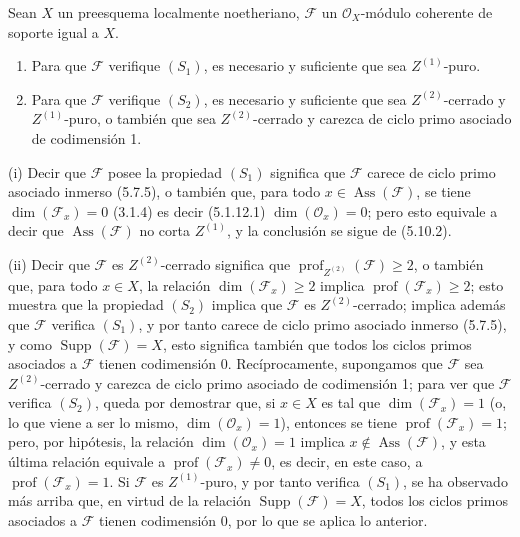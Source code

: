 \begin{proposition}[5.10.14]
\label{IV.2.s5.10.14-fr}
Sean $X$ un preesquema localmente noetheriano, $\mathcal F$ un
$\mathcal O_X$-módulo coherente de soporte igual a $X$.
\begin{enumerate}
\item[\textup{(i)}] Para que $\mathcal F$ verifique $(S_1)$, es necesario y suficiente
que sea $Z^{(1)}$-puro.
\item[\textup{(ii)}] Para que $\mathcal F$ verifique $(S_2)$, es necesario y suficiente
que sea $Z^{(2)}$-cerrado y $Z^{(1)}$-puro, o también que sea $Z^{(2)}$-cerrado
y carezca de ciclo primo asociado de codimensión 1.
\end{enumerate}
\end{proposition}

(i) Decir que $\mathcal F$ posee la propiedad $(S_1)$ significa que
$\mathcal F$ carece de ciclo primo asociado inmerso (5.7.5), o también que,
para todo $x\in\operatorname{Ass}(\mathcal F)$, se tiene
$\dim(\mathcal F_x)=0$ (3.1.4) es decir (5.1.12.1)
$\dim(\mathcal O_x)=0$; pero esto equivale a decir que
$\operatorname{Ass}(\mathcal F)$ no corta $Z^{(1)}$, y la conclusión se sigue
de (5.10.2).

(ii) Decir que $\mathcal F$ es $Z^{(2)}$-cerrado significa que
$\operatorname{prof}_{Z^{(2)}}(\mathcal F)\geq2$, o también que, para todo
$x\in X$, la relación $\dim(\mathcal F_x)\geq2$ implica
$\operatorname{prof}(\mathcal F_x)\geq2$; esto muestra que la propiedad
$(S_2)$ implica que $\mathcal F$ es $Z^{(2)}$-cerrado; implica además que
$\mathcal F$ verifica $(S_1)$, y por tanto carece de ciclo primo asociado
inmerso (5.7.5), y como $\operatorname{Supp}(\mathcal F)=X$, esto significa
también que todos los ciclos primos asociados a $\mathcal F$ tienen
codimensión 0. Recíprocamente, supongamos que $\mathcal F$ sea
$Z^{(2)}$-cerrado y carezca de ciclo primo asociado de codimensión 1; para ver
que $\mathcal F$ verifica $(S_2)$, queda por demostrar que, si $x\in X$ es tal
que $\dim(\mathcal F_x)=1$ (o, lo que viene a ser lo mismo,
$\dim(\mathcal O_x)=1$), entonces se tiene
$\operatorname{prof}(\mathcal F_x)=1$; pero, por hipótesis, la relación
$\dim(\mathcal O_x)=1$ implica $x\notin\operatorname{Ass}(\mathcal F)$, y
esta última relación equivale a $\operatorname{prof}(\mathcal F_x)\neq0$, es
decir, en este caso, a $\operatorname{prof}(\mathcal F_x)=1$. Si $\mathcal F$
es $Z^{(1)}$-puro, y por tanto verifica $(S_1)$, se ha observado más arriba que,
en virtud de la relación $\operatorname{Supp}(\mathcal F)=X$, todos los ciclos
primos asociados a $\mathcal F$ tienen codimensión 0, por lo que se aplica lo
anterior.

